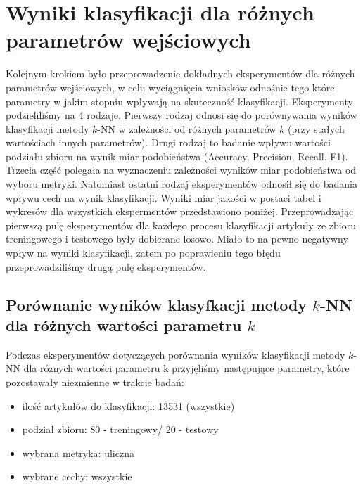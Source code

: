 \documentclass{classrep}
\begin{document}
\section{Wyniki klasyfikacji dla różnych parametrów wejściowych}
Kolejnym krokiem było przeprowadzenie dokładnych eksperymentów dla różnych parametrów wejściowych, w celu wyciągnięcia wniosków odnośnie tego które parametry w jakim stopniu wpływają na skuteczność klasyfikacji. Eksperymenty podzieliliśmy na 4 rodzaje. Pierwszy rodzaj odnosi się do porównywania wyników klasyfikacji metody $k$-NN w zależności od różnych parametrów $k$ (przy stałych wartościach innych parametrów). Drugi rodzaj to badanie wpływu wartości podziału zbioru na wynik miar podobieństwa (Accuracy, Precision, Recall, F1). Trzecia część polegała na wyznaczeniu zależności wyników miar podobieństwa od wyboru metryki. Natomiast ostatni rodzaj eksperymentów odnosił się do badania wpływu cech na wynik klasyfikacji. Wyniki miar jakości w postaci tabel i wykresów dla wszystkich ekspermentów przedstawiono poniżej. Przeprowadzając pierwszą pulę eksperymentów dla każdego procesu klasyfikacji artykuły ze zbioru treningowego i testowego były dobierane losowo. Miało to na pewno negatywny wpływ na wyniki klasyfikacji, zatem po poprawieniu tego błędu przeprowadziliśmy drugą pulę eksperymentów.

\subsection{Porównanie wyników klasyfkacji metody $k$-NN dla różnych wartości parametru $k$}

Podczas eksperymentów dotyczących porównania wyników klasyfikacji metody $k$-NN dla różnych wartości parametru k przyjęliśmy następujące parametry, które pozostawały niezmienne w trakcie badań:
\begin{itemize}
    \item ilość artykułów do klasyfikacji: 13531 (wszystkie)
    \item podział zbioru: 80 - treningowy/ 20 - testowy
    \item wybrana metryka: uliczna
    \item wybrane cechy: wszystkie
\end{itemize}


\end{document}
